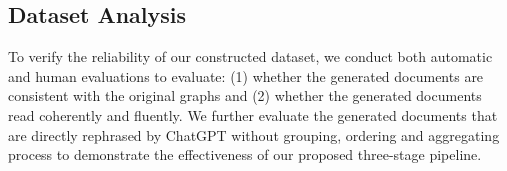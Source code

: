 \subsection{Dataset Analysis}
\label{Dataset Quality Evaluation}

To verify the reliability of our constructed dataset, we conduct both automatic and human evaluations to evaluate: (1) whether the generated documents are consistent with the original graphs and (2) whether the generated documents read coherently and fluently. 
We further evaluate the generated documents that are directly rephrased by ChatGPT without grouping, ordering and aggregating process to demonstrate the effectiveness of our proposed three-stage pipeline. 






